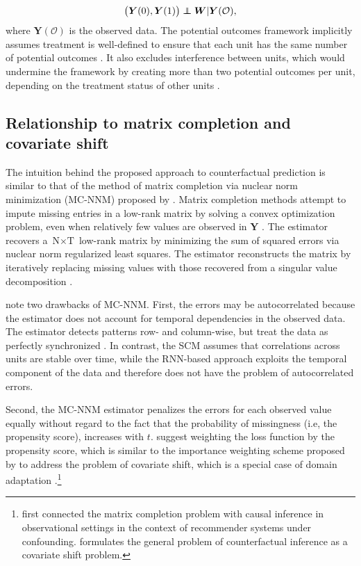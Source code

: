 $$
\left(\boldsymbol{Y}(0), \boldsymbol{Y}(1) \right) \independent \boldsymbol{W}| \boldsymbol{Y}(\mathcal{O}),
$$ where $\boldsymbol{Y}(\mathcal{O})$ is the observed data. The potential outcomes framework implicitly assumes treatment is well-defined to ensure that each unit has the same number of potential outcomes \citep{imbens2015causal}. It also excludes interference between units, which would undermine the framework by creating more than two potential outcomes per unit, depending on the treatment status of other units \citep{rubin1990}.

\subsection{Relationship to matrix completion and covariate shift}

The intuition behind the proposed approach to counterfactual prediction is similar to that of the method of matrix completion via nuclear norm minimization (MC-NNM) proposed by \citet{athey2017matrix}. Matrix completion methods attempt to impute missing entries in a low-rank matrix by solving a convex optimization problem, even when relatively few values are observed in $\boldsymbol{Y}$ \citep{candes2009exact,candes2010matrix}. The estimator recovers a $\text{N} \times \text{T}$ low-rank matrix by minimizing the sum of squared errors via nuclear norm regularized least squares. The estimator reconstructs the matrix by iteratively replacing missing values with those recovered from a singular value decomposition \citep{mazumder2010spectral}. 

\citet{athey2017matrix} note two drawbacks of MC-NNM. First, the errors may be autocorrelated because the estimator does not account for temporal dependencies in the observed data. The estimator detects patterns row- and column-wise, but treat the data as perfectly synchronized \citep{yoon2018estimating}. In contrast, the SCM assumes that correlations across units are stable over time, while the RNN-based approach exploits the temporal component of the data and therefore does not have the problem of autocorrelated errors. 

Second, the MC-NNM estimator penalizes the errors for each observed value equally without regard to the fact that the probability of missingness (i.e, the propensity score), increases with $t$. \citet{athey2017matrix} suggest weighting the loss function by the propensity score, which is similar to the importance weighting scheme proposed by \citet{cortes2008sample} to address the problem of covariate shift, which is a special case of domain adaptation \citep{huang2007correcting,ben2007analysis,bickel2009discriminative,cortes2010learning,JMLR:v17:15-239}.\footnote{\citet{schnabel2016recommendations} first connected the matrix completion problem with causal inference in observational settings in the context of recommender systems under confounding. \citet{johansson2016learning} formulates the general problem of counterfactual inference as a covariate shift problem.}

